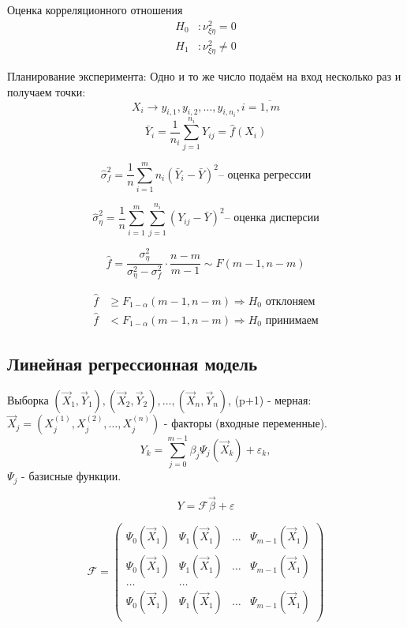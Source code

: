 Оценка корреляционного отношения
\begin{align*}
  H_0 &: \nu_{\xi\eta}^2 = 0 \\
  H_1 &: \nu_{\xi\eta}^2 \neq 0
\end{align*}

Планирование эксперимента:
Одно и то же число подаём на вход несколько раз и получаем точки:
\[
  X_i \rightarrow y_{i,1}, y_{i,2}, \dots, y_{i, n_i}, i = \overline{1, m}
\]
\[
  \bar Y_i = \dfrac{1}{n_i} \sum_{j=1}^{n_i} Y_{ij} = \hat f(X_i)
\]

\[
  \hat\sigma_f^2 = \dfrac{1}{n} \sum_{i=1}^m n_i (\bar Y_i - \bar Y)^2
  \text{-- оценка регрессии}
\]

\[
  \hat\sigma_\eta^2 = \dfrac{1}{n} \sum_{i=1}^m \sum_{j=1}^{n_i} (Y_{ij} - \bar Y)^2
  \text{-- оценка дисперсии}
\]

\[
  \hat f = \dfrac{\sigma_\eta^2}{\sigma_\eta^2 - \sigma_f^2} \cdot \dfrac{n-m}{m-1}
  \sim F(m-1, n-m)
\]

\begin{align*}
  \hat f &\geqslant F_{1-\alpha} (m-1, n-m) \Rightarrow \text{$H_0$ отклоняем} \\
  \hat f &< F_{1-\alpha} (m-1, n-m) \Rightarrow \text{$H_0$ принимаем}
\end{align*}

\subsection{Линейная регрессионная модель}

Выборка $(\vec{X}_1, \vec{Y}_1), (\vec{X}_2, \vec{Y}_2), \dots, (\vec{X}_n, \vec{Y}_n)$, 
(p+1) - мерная: $\vec{X}_j = (X_j^{(1)}, X_j^{(2)}, \dots, X_j^{(n)})$ - факторы (входные переменные).
\[
  Y_k = \sum_{j=0}^{m-1} \beta_j \Psi_j(\vec{X}_k) + \varepsilon_k,
\]
$\Psi_j$ - базисные функции.

\[
  Y = \mathcal{F} \vec{\beta} + \varepsilon
\]

\[
  \mathcal{F} = \begin{pmatrix}
    \Psi_0(\vec{X}_1) & \Psi_1(\vec{X}_1) & \dots & \Psi_{m-1} (\vec{X}_1) \\
    \Psi_0(\vec{X}_1) & \Psi_1(\vec{X}_1) & \dots & \Psi_{m-1} (\vec{X}_1) \\
    \dots & \dots \\
    \Psi_0(\vec{X}_1) & \Psi_1(\vec{X}_1) & \dots & \Psi_{m-1} (\vec{X}_1) \\
  \end{pmatrix}
\]

